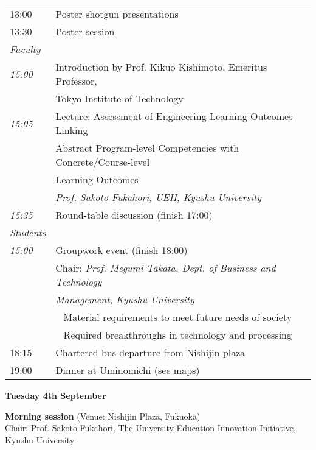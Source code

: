 \vspace{1em}
\noindent\begin{tabular}{|l|l|}
    \hline
    13:00   & Poster shotgun presentations \\
    13:30   & Poster session \\
    \hline
    \emph{Faculty} & \\
    \hspace{1em}\emph{15:00} & Introduction by Prof. Kikuo Kishimoto, Emeritus Professor, \\
                             & Tokyo Institute of Technology \\
    \hspace{1em}\emph{15:05} & Lecture: Assessment of Engineering Learning Outcomes Linking \\
                             & Abstract Program-level Competencies with Concrete/Course-level \\
                             & Learning Outcomes \\  
                             & \emph{Prof. Sakoto Fukahori,   UEII, Kyushu University} \\
    \hspace{1em}\emph{15:35} & Round-table discussion (finish 17:00) \\
    \hline
    \emph{Students} & \\
    \hspace{1em}\emph{15:00} & Groupwork event (finish 18:00) \\
            & Chair: {\em Prof. Megumi Takata, 	Dept. of Business and Technology} \\
            & {\em Management, Kyushu University}\\
            & ~ Material requirements to meet future needs of society \\
            & ~ Required breakthroughs in technology and processing \\
    \hline
    18:15   & Chartered bus departure from Nishijin plaza \\
    19:00   & Dinner at Uminomichi (see maps) \\
    \hline
\end{tabular}

\newpage
\begin{center}
{\bf \large Tuesday 4th September}
\end{center}
\vspace*{3ex}
{\bf Morning session} (Venue: Nishijin Plaza, Fukuoka)\\
Chair: Prof. Sakoto Fukahori,  The University Education Innovation Initiative, Kyushu University

